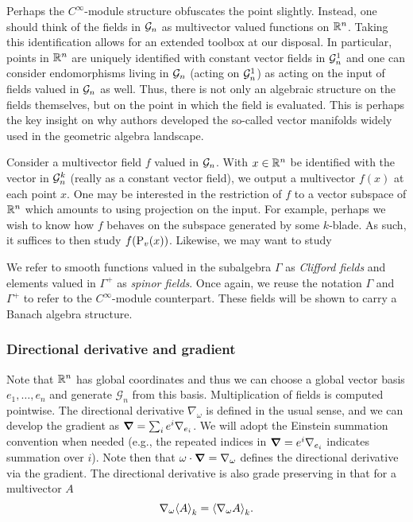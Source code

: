 Perhaps the $C^\infty$-module structure obfuscates the point slightly.  Instead, one should think of the fields in $\mathcal{G}_n$ as multivector valued functions on $\mathbb{R}^n$.  Taking this identification allows for an extended toolbox at our disposal.  In particular, points in $\mathbb{R}^n$ are uniquely identified with constant vector fields in $\mathcal{G}_n^1$ and one can consider endomorphisms living in $\mathcal{G}_n$ (acting on $\mathcal{G}_n^1$) as acting on the input of fields valued in $\mathcal{G}_n$ as well.  Thus, there is not only an algebraic structure on the fields themselves, but on the point in which the field is evaluated.  This is perhaps the key insight on why authors developed the so-called vector manifolds widely used in the geometric algebra landscape.

\begin{example}
    Consider a multivector field $f$ valued in $\mathcal{G}_n$.  With $x\in \mathbb{R}^n$ be identified with the vector in $\mathcal{G}_n^k$ (really as a constant vector field), we output a multivector $f(x)$ at each point $x$.  One may be interested in the restriction of $f$ to a vector subspace of $\mathbb{R}^n$ which amounts to using projection on the input.  For example, perhaps we wish to know how $f$ behaves on the subspace generated by some $k$-blade.  As such, it suffices to then study $f(\operatorname{P}_{v}(x))$.  Likewise, we may want to study 
\end{example}

We refer to smooth functions valued in the subalgebra $\Gamma$ as \emph{Clifford fields} and elements valued in $\Gamma^+$ as \emph{spinor fields}. Once again, we reuse the notation $\Gamma$ and $\Gamma^+$ to refer to the $C^\infty$-module counterpart. These fields will be shown to carry a Banach algebra structure. 


\subsubsection{Directional derivative and gradient}

Note that $\mathbb{R}^n$ has global coordinates and thus we can choose a global vector basis $e_1,\dots,e_n$ and generate $\mathcal{G}_n$ from this basis.  Multiplication of fields is computed pointwise. The directional derivative $\nabla_\omega$ is defined in the usual sense, and we can develop the gradient as $\boldsymbol{\nabla} = \sum_{i} e^i \nabla_{e_i}$.  We will adopt the Einstein summation convention when needed (e.g., the repeated indices in $\boldsymbol{\nabla} = e^i \nabla_{e_i}$ indicates summation over $i$). Note then that $\omega \cdot \boldsymbol{\nabla} = \nabla_\omega$ defines the directional derivative via the gradient. The directional derivative is also grade preserving in that for a multivector $A$
\[
\nabla_\omega \proj{k}{A} = \proj{k}{\nabla_\omega A}.
\]  

